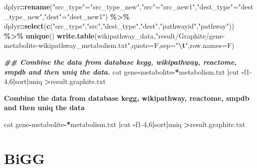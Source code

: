 \documentclass[
]{book}
\newenvironment{Shaded}{\begin{snugshade}}{\end{snugshade}}
\newcommand{\AttributeTok}[1]{\textcolor[rgb]{0.13,0.29,0.53}{#1}}
\newcommand{\DecValTok}[1]{\textcolor[rgb]{0.00,0.00,0.81}{#1}}
\newcommand{\DocumentationTok}[1]{\textcolor[rgb]{0.56,0.35,0.01}{\textbf{\textit{#1}}}}
\newcommand{\ErrorTok}[1]{\textcolor[rgb]{0.64,0.00,0.00}{\textbf{#1}}}
\newcommand{\FunctionTok}[1]{\textcolor[rgb]{0.13,0.29,0.53}{\textbf{#1}}}
\newcommand{\NormalTok}[1]{#1}
\newcommand{\OtherTok}[1]{\textcolor[rgb]{0.56,0.35,0.01}{#1}}
\newcommand{\SpecialCharTok}[1]{\textcolor[rgb]{0.81,0.36,0.00}{\textbf{#1}}}
\newcommand{\StringTok}[1]{\textcolor[rgb]{0.31,0.60,0.02}{#1}}
\begin{document}
\begin{Shaded}
\begin{Highlighting}[]
\NormalTok{  dplyr}\SpecialCharTok{::}\FunctionTok{rename}\NormalTok{(}\StringTok{"src\_type"}\OtherTok{=}\StringTok{"src\_type\_new"}\NormalTok{,}\StringTok{"src"}\OtherTok{=}\StringTok{"src\_new1"}\NormalTok{,}\StringTok{"dest\_type"}\OtherTok{=}\StringTok{"dest\_type\_new"}\NormalTok{,}\StringTok{"dest"}\OtherTok{=}\StringTok{"dest\_new1"}\NormalTok{) }\SpecialCharTok{\%\textgreater{}\%}
\NormalTok{  dplyr}\SpecialCharTok{::}\FunctionTok{select}\NormalTok{(}\FunctionTok{c}\NormalTok{(}\StringTok{"src\_type"}\NormalTok{,}\StringTok{"src"}\NormalTok{,}\StringTok{"dest\_type"}\NormalTok{,}\StringTok{"dest"}\NormalTok{,}\StringTok{"pathwayid"}\NormalTok{,}\StringTok{"pathway"}\NormalTok{)) }\SpecialCharTok{\%\textgreater{}\%}
  \FunctionTok{unique}\NormalTok{()}
\FunctionTok{write.table}\NormalTok{(wikipathway\_data,}\StringTok{"result/Graphite/gene{-}metabolite{-}wikipathway\_metabolism.txt"}\NormalTok{,}\AttributeTok{quote=}\NormalTok{F,}\AttributeTok{sep=}\StringTok{"}\SpecialCharTok{\textbackslash{}t}\StringTok{"}\NormalTok{,}\AttributeTok{row.names=}\NormalTok{F)}

\DocumentationTok{\#\# Combine the data from database kegg, wikipathway, reactome, smpdb and then uniq the data.}
\NormalTok{cat gene}\SpecialCharTok{{-}}\NormalTok{metabolite}\SpecialCharTok{{-}}\ErrorTok{*}\NormalTok{metabolism.txt }\SpecialCharTok{|}\NormalTok{cut }\SpecialCharTok{{-}}\NormalTok{f1}\DecValTok{{-}4}\NormalTok{,}\DecValTok{6}\SpecialCharTok{|}\NormalTok{sort}\SpecialCharTok{|}\NormalTok{uniq }\SpecialCharTok{\textgreater{}}\NormalTok{result.graphite.txt}
\end{Highlighting}
\end{Shaded}

\textbf{Combine the data from database kegg, wikipathway, reactome, smpdb and then uniq the data}

\begin{Shaded}
\begin{Highlighting}[]
\NormalTok{cat gene}\SpecialCharTok{{-}}\NormalTok{metabolite}\SpecialCharTok{{-}}\ErrorTok{*}\NormalTok{metabolism.txt }\SpecialCharTok{|}\NormalTok{cut }\SpecialCharTok{{-}}\NormalTok{f1}\DecValTok{{-}4}\NormalTok{,}\DecValTok{6}\SpecialCharTok{|}\NormalTok{sort}\SpecialCharTok{|}\NormalTok{uniq }\SpecialCharTok{\textgreater{}}\NormalTok{result.graphite.txt}
\end{Highlighting}
\end{Shaded}

\section{BiGG}\label{bigg}
\end{document}
